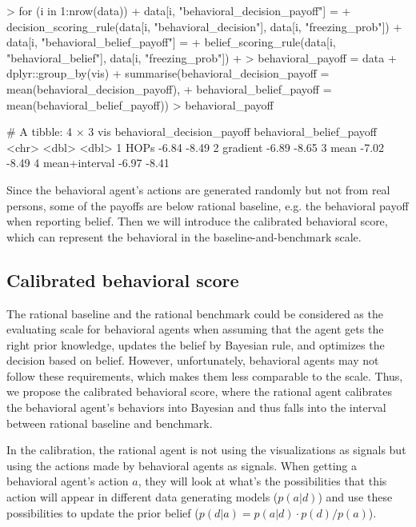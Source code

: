 \documentclass{article}
\begin{document}
\begin{Schunk}
\begin{Sinput}
> for (i in 1:nrow(data)) {
+   data[i, "behavioral_decision_payoff"] = 
+     decision_scoring_rule(data[i, "behavioral_decision"], data[i, "freezing_prob"])
+   data[i, "behavioral_belief_payoff"] = 
+     belief_scoring_rule(data[i, "behavioral_belief"], data[i, "freezing_prob"])
+ }
> behavioral_payoff = data %>%
+   dplyr::group_by(vis) %>%
+   summarise(behavioral_decision_payoff = mean(behavioral_decision_payoff),
+             behavioral_belief_payoff = mean(behavioral_belief_payoff))
> behavioral_payoff
\end{Sinput}
\begin{Soutput}
# A tibble: 4 × 3
  vis           behavioral_decision_payoff behavioral_belief_payoff
  <chr>                              <dbl>                    <dbl>
1 HOPs                               -6.84                    -8.49
2 gradient                           -6.89                    -8.65
3 mean                               -7.02                    -8.49
4 mean+interval                      -6.97                    -8.41
\end{Soutput}
\end{Schunk}

Since the behavioral agent's actions are generated randomly but not from real persons, some of the payoffs are below rational baseline, e.g. the behavioral payoff when reporting belief. Then we will introduce the calibrated behavioral score, which can represent the behavioral in the baseline-and-benchmark scale.

\subsection{Calibrated behavioral score}

The rational baseline and the rational benchmark could be considered as the evaluating scale for behavioral agents when assuming that the agent gets the right prior knowledge, updates the belief by Bayesian rule, and optimizes the decision based on belief. However, unfortunately, behavioral agents may not follow these requirements, which makes them less comparable to the scale. Thus, we propose the calibrated behavioral score, where the rational agent calibrates the behavioral agent's behaviors into Bayesian and thus falls into the interval between rational baseline and benchmark.

In the calibration, the rational agent is not using the visualizations as signals but using the actions made by behavioral agents as signals. When getting a behavioral agent's action $a$, they will look at what's the possibilities that this action will appear in different data generating models ($p(a|d)$) and use these possibilities to update the prior belief ($p(d|a) = p(a|d) \cdot p(d) / p(a)$).
\end{document}
